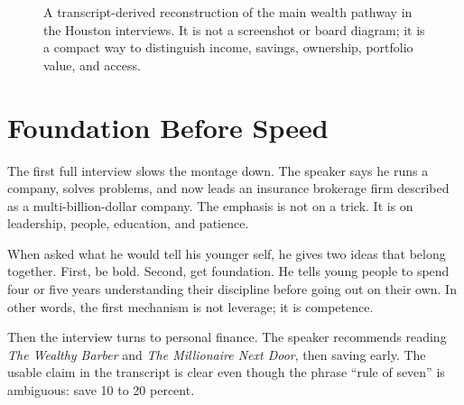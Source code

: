 \begin{figure}
\centering
{}
\caption{A transcript-derived reconstruction of the main wealth pathway in the Houston interviews. It is not a screenshot or board diagram; it is a compact way to distinguish income, savings, ownership, portfolio value, and access.}
\end{figure}

\section{Foundation Before Speed}

The first full interview slows the montage down. The speaker says he runs a company, solves problems, and now leads an insurance brokerage firm described as a multi-billion-dollar company. The emphasis is not on a trick. It is on leadership, people, education, and patience.

When asked what he would tell his younger self, he gives two ideas that belong together. First, be bold. Second, get foundation. He tells young people to spend four or five years understanding their discipline before going out on their own. In other words, the first mechanism is not leverage; it is competence.

Then the interview turns to personal finance. The speaker recommends reading \emph{The Wealthy Barber} and \emph{The Millionaire Next Door}, then saving early. The usable claim in the transcript is clear even though the phrase ``rule of seven'' is ambiguous: save 10 to 20 percent.

